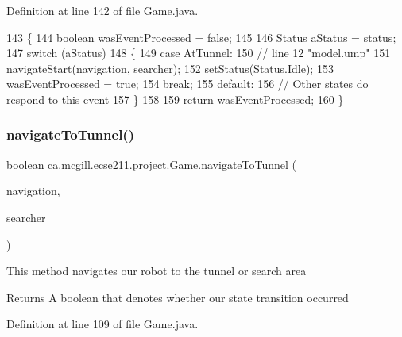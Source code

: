 Definition at line 142 of file Game.\+java.


\begin{DoxyCode}
143   \{
144     \textcolor{keywordtype}{boolean} wasEventProcessed = \textcolor{keyword}{false};
145     
146     Status aStatus = status;
147     \textcolor{keywordflow}{switch} (aStatus)
148     \{
149       \textcolor{keywordflow}{case} AtTunnel:
150         \textcolor{comment}{// line 12 "model.ump"}
151         navigateStart(navigation, searcher);
152         setStatus(Status.Idle);
153         wasEventProcessed = \textcolor{keyword}{true};
154         \textcolor{keywordflow}{break};
155       \textcolor{keywordflow}{default}:
156         \textcolor{comment}{// Other states do respond to this event}
157     \}
158 
159     \textcolor{keywordflow}{return} wasEventProcessed;
160   \}
\end{DoxyCode}
\mbox{\label{enumca_1_1mcgill_1_1ecse211_1_1project_1_1_game_ad3d03cffa33c927317d8fcba0c928a24}} 
\subsubsection{\texorpdfstring{navigate\+To\+Tunnel()}{navigateToTunnel()}}
{\footnotesize\ttfamily boolean ca.\+mcgill.\+ecse211.\+project.\+Game.\+navigate\+To\+Tunnel (\begin{DoxyParamCaption}\item[{\hyperlink{classca_1_1mcgill_1_1ecse211_1_1project_1_1_navigation}{Navigation}}]{navigation,  }\item[{\hyperlink{classca_1_1mcgill_1_1ecse211_1_1project_1_1_ring_searcher}{Ring\+Searcher}}]{searcher }\end{DoxyParamCaption})}

This method navigates our robot to the tunnel or search area

\begin{DoxyReturn}{Returns}
A boolean that denotes whether our state transition occurred 
\end{DoxyReturn}


Definition at line 109 of file Game.\+java.


